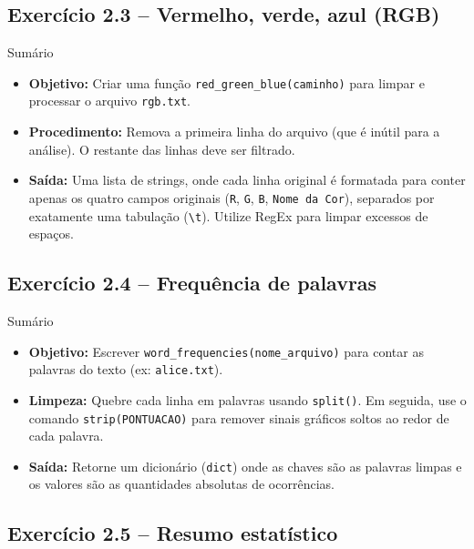 \documentclass[11pt,a4paper]{article}
\begin{document}
\subsection*{Exercício 2.3 -- Vermelho, verde, azul (RGB)}

\begin{exercicio}{Sumário}
\begin{itemize}
    \item \textbf{Objetivo:} Criar uma função \texttt{red\_green\_blue(caminho)} para limpar e processar o arquivo \texttt{rgb.txt}.
    \item \textbf{Procedimento:} Remova a primeira linha do arquivo (que é inútil para a análise). O restante das linhas deve ser filtrado.
    \item \textbf{Saída:} Uma lista de strings, onde cada linha original é formatada para conter apenas os quatro campos originais (\texttt{R}, \texttt{G}, \texttt{B}, \texttt{Nome da Cor}), separados por exatamente uma tabulação (\texttt{\textbackslash t}). Utilize RegEx para limpar excessos de espaços.
\end{itemize}
\end{exercicio}

\subsection*{Exercício 2.4 -- Frequência de palavras}

\begin{exercicio}{Sumário}
\begin{itemize}
    \item \textbf{Objetivo:} Escrever \texttt{word\_frequencies(nome\_arquivo)} para contar as palavras do texto (ex: \texttt{alice.txt}).
    \item \textbf{Limpeza:} Quebre cada linha em palavras usando \texttt{split()}. Em seguida, use o comando \texttt{strip(PONTUACAO)} para remover sinais gráficos soltos ao redor de cada palavra.
    \item \textbf{Saída:} Retorne um dicionário (\texttt{dict}) onde as chaves são as palavras limpas e os valores são as quantidades absolutas de ocorrências.
\end{itemize}
\end{exercicio}

\subsection*{Exercício 2.5 -- Resumo estatístico}
\end{document}
